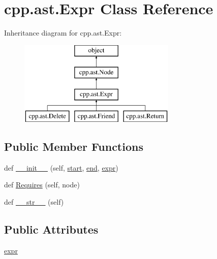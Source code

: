 \hypertarget{classcpp_1_1ast_1_1_expr}{}\section{cpp.\+ast.\+Expr Class Reference}
\label{classcpp_1_1ast_1_1_expr}
Inheritance diagram for cpp.\+ast.\+Expr\+:\begin{figure}[H]
\begin{center}
\leavevmode
\includegraphics[height=4.000000cm]{d4/da1/classcpp_1_1ast_1_1_expr}
\end{center}
\end{figure}
\subsection*{Public Member Functions}
\begin{DoxyCompactItemize}
\item 
def \mbox{\hyperlink{classcpp_1_1ast_1_1_expr_adc83f4b17d6e28a39781678692eb25aa}{\+\_\+\+\_\+init\+\_\+\+\_\+}} (self, \mbox{\hyperlink{classcpp_1_1ast_1_1_node_a7b2aa97e6a049bb1a93aea48c48f1f44}{start}}, \mbox{\hyperlink{classcpp_1_1ast_1_1_node_a3c5e5246ccf619df28eca02e29d69647}{end}}, \mbox{\hyperlink{classcpp_1_1ast_1_1_expr_a2f4e13fb0176f2616f8703103c806462}{expr}})
\item 
def \mbox{\hyperlink{classcpp_1_1ast_1_1_expr_a9c92416eb1285068f190dcda8fd33682}{Requires}} (self, node)
\item 
def \mbox{\hyperlink{classcpp_1_1ast_1_1_expr_a7ee1896fbfa7819adbd0b2f89d11ecec}{\+\_\+\+\_\+str\+\_\+\+\_\+}} (self)
\end{DoxyCompactItemize}
\subsection*{Public Attributes}
\begin{DoxyCompactItemize}
\item 
\mbox{\hyperlink{classcpp_1_1ast_1_1_expr_a2f4e13fb0176f2616f8703103c806462}{expr}}
\end{DoxyCompactItemize}


